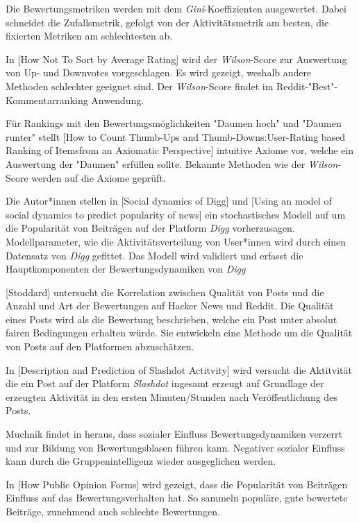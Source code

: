 Die Bewertungsmetriken werden mit dem \textit{Gini}-Koeffizienten ausgewertet. Dabei schneidet die Zufallsmetrik, gefolgt von der Aktivitätsmetrik am besten, die fixierten Metriken am schlechtesten ab.


In [How Not To Sort by Average Rating] wird der \textit{Wilson}-Score zur Auswertung von Up- und Downvotes vorgeschlagen. Es wird gezeigt, weshalb andere Methoden schlechter geeignet sind. Der \textit{Wilson}-Score findet im Reddit-"Best"-Kommentarranking Anwendung.

Für Rankings mit den Bewertungsmöglichkeiten "Daumen hoch" und "Daumen runter" stellt [How to Count Thumb-Ups and Thumb-Downs:User-Rating based Ranking of Itemsfrom an Axiomatic Perspective] intuitive Axiome vor, welche ein Auswertung der "Daumen" erfüllen sollte. Bekannte Methoden wie der \textit{Wilson}-Score werden auf die Axiome geprüft. %

Die Autor*innen stellen in [Social dynamics of Digg] und [Using an model of social dynamics to predict popularity of news] ein stochastisches Modell auf um die Popularität von Beiträgen auf der Platform \textit{Digg} vorherzusagen. Modellparameter, wie die Aktivitätsverteilung von User*innen wird durch einen Datensatz von \textit{Digg} gefittet. Das Modell wird validiert und erfasst die Hauptkomponenten der Bewertungsdynamiken von \textit{Digg}

[Stoddard] untersucht die Korrelation zwischen Qualität von Posts und die Anzahl und Art der Bewertungen auf Hacker News und Reddit. Die Qualität eines Posts wird als die Bewertung beschrieben, welche ein Post unter absolut fairen Bedingungen erhalten würde. Sie entwickeln eine Methode um die Qualität von Posts auf den Platformen abzuschätzen.

In [Description and Prediction of Slashdot Actitvity] wird versucht die Aktitvität die ein Post auf der Platform \textit{Slashdot} ingesamt erzeugt auf Grundlage der erzeugten Aktivität in den ersten Minuten/Stunden nach Veröffentlichung des Posts. 

Muchnik findet in \cite{Muchnik2013647} heraus, dass sozialer Einfluss Bewertungsdynamiken verzerrt und zur Bildung von Bewertungsblasen führen kann.
Negativer sozialer Einfluss kann durch die Gruppenintelligenz wieder ausgeglichen werden.

In [How Public Opinion Forms] wird gezeigt, dass die Popularität von Beiträgen Einfluss auf das Bewertungsverhalten hat. So sammeln populäre, gute bewertete Beiträge, zunehmend auch schlechte Bewertungen.

